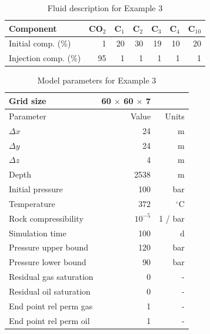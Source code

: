 \documentclass[twocolumn,numbook]{svjour3}          %
\begin{document}
\begin{table}
\centering
\caption{Fluid description for Example 3}
\begin{tabular}{|l|r|r|r|r|r|r|}
\hline
Component            & CO$_2$ & C$_1$ & C$_2$ & C$_3$ & C$_4$  & C$_{10}$ \\
\hline
Initial comp. (\%)   & 1    & 20  & 30  & 19  & 10   & 20     \\
Injection comp. (\%) & 95   &  1  &  1  &  1  &  1   &  1     \\
\hline
\end{tabular}
\label{table:VanEssenModelFluid}
\end{table}

\begin{table}
\centering
\caption{Model parameters for Example 3}
\begin{tabular}{|l|rr|}
\hline
Grid size                       & 60 $\times$ 60 $\times$ 7        &           \\
\hline\hline
Parameter                      & Value           & Units     \\
\hline
\hline
$\Delta x$                     & 24           & m            \\
$\Delta y$                     & 24           & m            \\
$\Delta z$                     &  4           & m            \\
Depth                          & 2538       & m            \\
Initial pressure               & 100          & bar          \\
Temperature                    & $372$     & $^\circ$C    \\
Rock compressibility           & $10^{-5}$    & 1 / bar      \\
Simulation time                & 100          & d            \\
Pressure upper bound           & 120          & bar          \\
Pressure lower bound           &  90          & bar          \\
\hline
Residual gas saturation  & 0 & -                             \\
Residual oil saturation  & 0 & -                             \\
End point rel perm gas   & 1 & -                             \\
End point rel perm oil   & 1 & -                             \\

\end{tabular}
\end{table}
\end{document}
